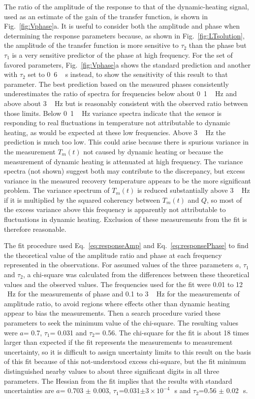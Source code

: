 \documentclass[amt, manuscript]{copernicus}
\begin{document}
The ratio of the amplitude of the response to that of the
dynamic-heating signal, used as an estimate of the gain of the transfer
function, is shown in Fig.~\ref{fig:Vphase}a. It is useful to consider
both the amplitude and phase when determining the response parameters
because, as shown in Fig.~\ref{fig:LTsolution}, the amplitude of the
transfer function is more sensitive to \(\tau_{2}\) than the phase but
\(\tau_{1}\) is a very sensitive predictor of the phase at high
frequency. For the set of favored parameters, Fig.~\ref{fig:Vphase}a
shows the standard prediction and another with \(\tau_{2}\) set to
\unit{0.6\,s} instead, to show the sensitivity of this result to that
parameter. The best prediction based on the measured phases consistently
underestimates the ratio of spectra for frequencies below about
\unit{0.1\,Hz} and above about \unit{3\,Hz} but is reasonably consistent
with the observed ratio between those limits. Below \unit{0.1\,Hz}
variance spectra indicate that the sensor is responding to real
fluctuations in temperature not attributable to dynamic heating, as
would be expected at these low frequencies. Above \unit{3\,Hz} the
prediction is much too low. This could arise because there is spurious
variance in the measurement \(T_m(t)\) not caused by dynamic heating or
because the measurement of dynamic heating is attenuated at high
frequency. The variance spectra (not shown) suggest both may contribute
to the discrepancy, but excess variance in the measured recovery
temperature appears to be the more significant problem. The variance
spectrum of \(T_m(t)\) is reduced substantially above \unit{3\,Hz} if it
is multiplied by the squared coherency between \(T_m(t)\) and \(Q\), so
most of the excess variance above this frequency is apparently not
attributable to fluctuations in dynamic heating. Exclusion of these
measurements from the fit is therefore reasonable.

The fit procedure used Eq.~\eqref{eq:responseAmp} and
Eq.~\eqref{eq:responsePhase} to find the theoretical value of the
amplitude ratio and phase at each frequency represented in the
observations. For assumed values of the three parameters \(a\),
\(\tau_{1}\) and \(\tau_{2}\), a chi-square was calculated from the
differences between these theoretical values and the observed values.
The frequencies used for the fit were 0.01 to \unit{12\,Hz} for the
measurements of phase and 0.1 to \unit{3\,Hz} for the measurements of
amplitude ratio, to avoid regions where effects other than dynamic
heating appear to bias the measurements. Then a search procedure varied
these parameters to seek the minimum value of the chi-square. The
resulting values were \(a\)= 0.7, \(\tau_{1}\)= 0.031 and \(\tau_{2}\)=
0.56. The chi-square for the fit is about 18 times larger than expected
if the fit represents the measurements to measurement uncertainty, so it
is difficult to assign uncertainty limits to this result on the basis of
this fit because of this not-understood excess chi-square, but the fit
minimum distinguished nearby values to about three significant digits in
all three parameters. The Hessian from the fit implies that the results
with standard uncertainties are \(a\)= 0.703 \(\pm\) 0.003,
\(\tau_{1}\)=0.031\(\pm\)\ensuremath{3\times 10^{-4}}\unit{\,s} and
\(\tau_{2}\)=0.56 \(\pm\) 0.02\unit{\,s}.
\end{document}
